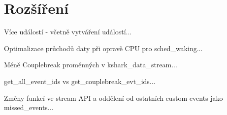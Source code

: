 \section{Rozšíření}

Více událostí - včetně vytváření \uv{[origin]} událostí...

Optimalizace průchodů daty při opravě CPU pro sched\_waking...

Méně Couplebreak proměnných v kshark\_data\_stream...

get\_all\_event\_ids vs get\_couplebreak\_evt\_ids...

Změny funkcí ve stream API a oddělení od ostatních custom events jako missed\_events...
